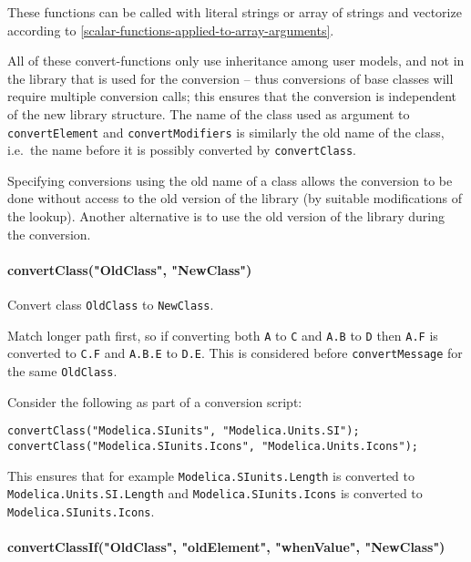 These functions can be called with literal strings or array of strings
and vectorize according to \cref{scalar-functions-applied-to-array-arguments}.

All of these convert-functions only use inheritance among user models, and not in the library that is used for the conversion -- thus conversions of base classes will require multiple conversion calls; this ensures that the conversion is independent of the new library structure.
The name of the class used as argument to \lstinline!convertElement! and \lstinline!convertModifiers! is similarly the old name of the class, i.e.\ the name before it is possibly converted by \lstinline!convertClass!.

\begin{nonnormative}
Specifying conversions using the old name of a class allows the conversion to be done without access to the old
version of the library (by suitable modifications of the lookup).  Another alternative is to use the old version
of the library during the conversion.
\end{nonnormative}

\paragraph*{convertClass("OldClass", "NewClass")}\label{convertclassoldclassnewclass}

Convert class \lstinline!OldClass! to \lstinline!NewClass!.

Match longer path first, so if converting both \lstinline!A! to \lstinline!C! and \lstinline!A.B! to \lstinline!D! then \lstinline!A.F! is converted to \lstinline!C.F! and \lstinline!A.B.E! to \lstinline!D.E!. This is considered before \lstinline!convertMessage! for the same \lstinline!OldClass!.

\begin{example}
Consider the following as part of a conversion script:
\begin{lstlisting}[language=modelica]
convertClass("Modelica.SIunits", "Modelica.Units.SI");
convertClass("Modelica.SIunits.Icons", "Modelica.Units.Icons");
\end{lstlisting}
This ensures that for example \lstinline!Modelica.SIunits.Length! is converted to \lstinline!Modelica.Units.SI.Length!
and \lstinline!Modelica.SIunits.Icons! is converted to \lstinline!Modelica.SIunits.Icons!.
\end{example}

\paragraph*{convertClassIf("OldClass", "oldElement", "whenValue", "NewClass")}\label{convertclassifoldclass-oldelement-whenvalue-newclass}

